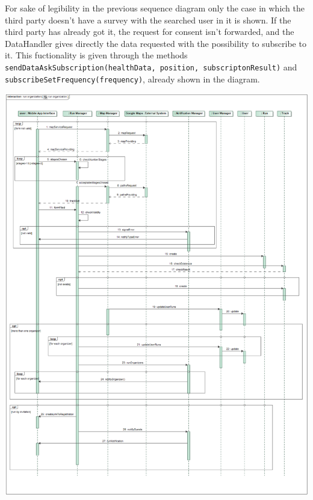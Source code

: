 For sake of legibility in the previous sequence diagram only the case in which the third party doesn't have a survey with the searched user in it is shown. If the third party has already got it, the request for consent isn't forwarded, and the DataHandler gives directly the data requested with the possibility to subscribe to it. This fuctionality is given through the methods \texttt{sendDataAskSubscription(healthData, position, subscriptonResult)} and \texttt{subscribeSetF\-requency(frequency)}, already shown in the diagram. 

\begin{center}
\includegraphics[scale=0.35]{sections/diagrams/run_organization}
\newline
{}
\end{center}

